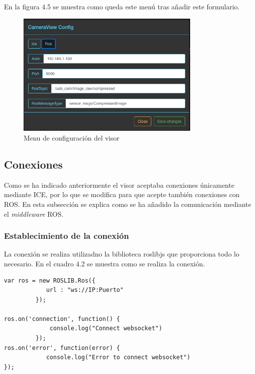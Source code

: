 En la figura 4.5 se muestra como queda este menú tras añadir este formulario.

\begin{figure}[H]
  \begin{center}
    \includegraphics[width=0.8\textwidth]{figures/configuracioncamviz.png}
		\caption{Menu de configuración del visor}
		\label{fig.configuracioncamviz}
		\end{center}
\end{figure}

\subsection{Conexiones}

Como se ha indicado anteriormente el visor aceptaba conexiones únicamente mediante ICE, por lo que se modifica para que acepte también conexiones con ROS. En esta subsección se explica como se ha añadido la comunicación mediante el \textit{middleware} ROS.

\subsubsection{Establecimiento de la conexión}

La conexión se realiza utilizadno la biblioteca roslibjs que proporciona todo lo necesario. En el cuadro 4.2 se muestra como se realiza la conexión.

\begin{lstlisting}[caption= Establecimiento de la conexión ROS, label=cod.conexioncamviz]
var ros = new ROSLIB.Ros({
            url : "ws://IP:Puerto"
         });

ros.on('connection', function() {
             console.log("Connect websocket")
         });
ros.on('error', function(error) {
            console.log("Error to connect websocket")
});
\end{lstlisting}

